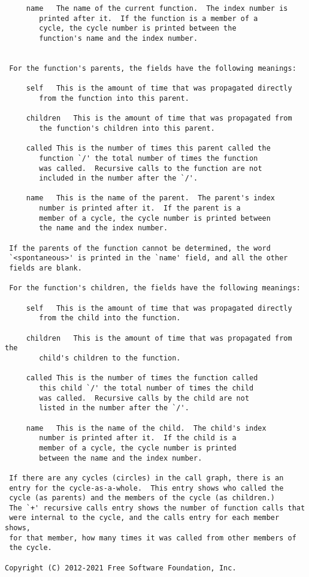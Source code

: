 \documentclass[a4paper,twosidep]{article}
\begin{document}
\begin{verbatim}
     name	The name of the current function.  The index number is
		printed after it.  If the function is a member of a
		cycle, the cycle number is printed between the
		function's name and the index number.


 For the function's parents, the fields have the following meanings:

     self	This is the amount of time that was propagated directly
		from the function into this parent.

     children	This is the amount of time that was propagated from
		the function's children into this parent.

     called	This is the number of times this parent called the
		function `/' the total number of times the function
		was called.  Recursive calls to the function are not
		included in the number after the `/'.

     name	This is the name of the parent.  The parent's index
		number is printed after it.  If the parent is a
		member of a cycle, the cycle number is printed between
		the name and the index number.

 If the parents of the function cannot be determined, the word
 `<spontaneous>' is printed in the `name' field, and all the other
 fields are blank.

 For the function's children, the fields have the following meanings:

     self	This is the amount of time that was propagated directly
		from the child into the function.

     children	This is the amount of time that was propagated from the
		child's children to the function.

     called	This is the number of times the function called
		this child `/' the total number of times the child
		was called.  Recursive calls by the child are not
		listed in the number after the `/'.

     name	This is the name of the child.  The child's index
		number is printed after it.  If the child is a
		member of a cycle, the cycle number is printed
		between the name and the index number.

 If there are any cycles (circles) in the call graph, there is an
 entry for the cycle-as-a-whole.  This entry shows who called the
 cycle (as parents) and the members of the cycle (as children.)
 The `+' recursive calls entry shows the number of function calls that
 were internal to the cycle, and the calls entry for each member shows,
 for that member, how many times it was called from other members of
 the cycle.

Copyright (C) 2012-2021 Free Software Foundation, Inc.


\end{verbatim}
\end{document}
